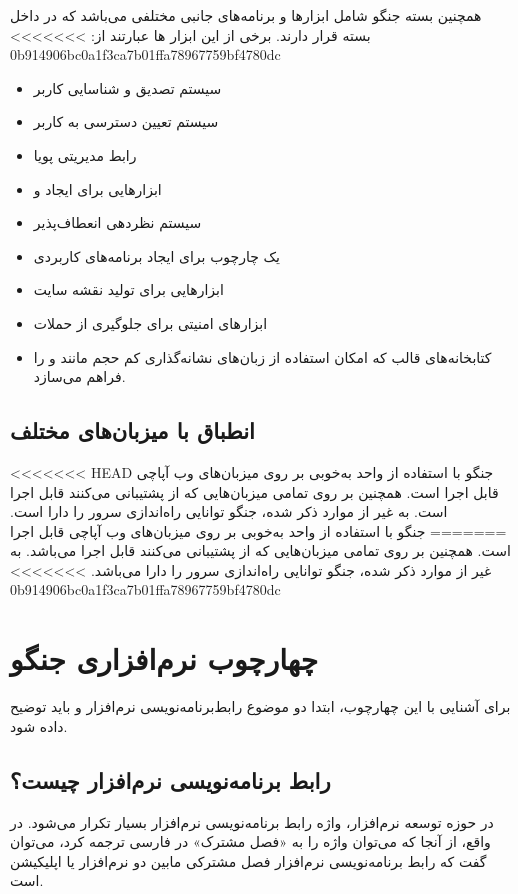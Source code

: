 {{همچنین بسته جنگو شامل ابزارها و برنامه‌های جانبی مختلفی می‌باشد که در داخل بسته  قرار دارند. برخی از این ابزار ها عبارتند از:
>>>>>>> 0b914906bc0a1f3ca7b01ffa78967759bf4780dc
\begin{itemize}
	\item سیستم تصدیق و شناسایی کاربر
	\item سیستم تعیین دسترسی به کاربر
	\item رابط مدیریتی پویا
	\item ابزارهایی برای ایجاد  و 
	\item سیستم نظر‌دهی انعطاف‌پذیر
	\item یک چارچوب برای ایجاد برنامه‌های کاربردی 
	\item ابزارهایی برای تولید نقشه سایت
	\item ابزارهای امنیتی برای جلوگیری از حملات 
	\item کتابخانه‌های قالب که امکان استفاده از زبان‌های نشانه‌گذاری کم حجم مانند  و  را فراهم می‌سازد.
\end{itemize}
 
\subsection{انطباق با میزبان‌های مختلف}
<<<<<<< HEAD
جنگو با استفاده از واحد  به‌خوبی بر روی میزبان‌های وب آپاچی قابل اجرا است. همچنین بر روی تمامی میزبان‌هایی که از پشتیبانی می‌کنند قابل اجرا است. به غیر از موارد ذکر شده، جنگو توانایی راه‌اندازی سرور  را دارا است.
=======
جنگو با استفاده از واحد  به‌خوبی بر روی میزبان‌های وب آپاچی قابل اجرا است. همچنین بر روی تمامی میزبان‌هایی که از پشتیبانی می‌کنند قابل اجرا می‌باشد. به غیر از موارد ذکر شده، جنگو توانایی راه‌اندازی سرور  را دارا می‌باشد.
>>>>>>> 0b914906bc0a1f3ca7b01ffa78967759bf4780dc
 
\section{چهارچوب نرم‌افزاری  جنگو}
برای آشنایی با این چهارچوب، ابتدا دو موضوع رابط‌برنامه‌نویسی نرم‌افزار و  باید توضیح داده شود.
 
\subsection{رابط برنامه‌نویسی نرم‌افزار چیست؟}
در حوزه توسعه نرم‌افزار، واژه‌ رابط برنامه‌نویسی نرم‌افزار بسیار تکرار می‌شود. در واقع، از آنجا که می‌توان واژه  را به «فصل مشترک» در فارسی ترجمه کرد، می‌توان گفت که رابط برنامه‌نویسی نرم‌افزار فصل مشترکی مابین دو نرم‌افزار یا اپلیکیشن است.
}}
